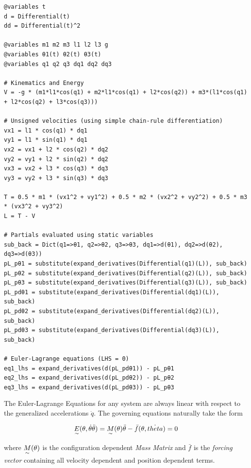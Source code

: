 \begin{verbatim}
@variables t
d = Differential(t)
dd = Differential(t)^2

@variables m1 m2 m3 l1 l2 l3 g
@variables θ1(t) θ2(t) θ3(t)
@variables q1 q2 q3 dq1 dq2 dq3

# Kinematics and Energy
V = -g * (m1*l1*cos(q1) + m2*l1*cos(q1) + l2*cos(q2)) + m3*(l1*cos(q1) + l2*cos(q2) + l3*cos(q3)))

# Unsigned velocities (using simple chain-rule differentiation)
vx1 = l1 * cos(q1) * dq1
vy1 = l1 * sin(q1) * dq1
vx2 = vx1 + l2 * cos(q2) * dq2
vy2 = vy1 + l2 * sin(q2) * dq2
vx3 = vx2 + l3 * cos(q3) * dq3
vy3 = vy2 + l3 * sin(q3) * dq3

T = 0.5 * m1 * (vx1^2 + vy1^2) + 0.5 * m2 * (vx2^2 + vy2^2) + 0.5 * m3 * (vx3^2 + vy3^2)
L = T - V

# Partials evaluated using static variables
sub_back = Dict(q1=>θ1, q2=>θ2, q3=>θ3, dq1=>d(θ1), dq2=>d(θ2), dq3=>d(θ3))
pL_pθ1 = substitute(expand_derivatives(Differential(q1)(L)), sub_back)
pL_pθ2 = substitute(expand_derivatives(Differential(q2)(L)), sub_back)
pL_pθ3 = substitute(expand_derivatives(Differential(q3)(L)), sub_back)
pL_pdθ1 = substitute(expand_derivatives(Differential(dq1)(L)), sub_back)
pL_pdθ2 = substitute(expand_derivatives(Differential(dq2)(L)), sub_back)
pL_pdθ3 = substitute(expand_derivatives(Differential(dq3)(L)), sub_back)

# Euler-Lagrange equations (LHS = 0)
eq1_lhs = expand_derivatives(d(pL_pdθ1)) - pL_pθ1
eq2_lhs = expand_derivatives(d(pL_pdθ2)) - pL_pθ2
eq3_lhs = expand_derivatives(d(pL_pdθ3)) - pL_pθ3
\end{verbatim}

The Euler-Lagrange Equations for any system are always linear with respect to the generalized accelerations $\ddot{q}$. The governing equations naturally take the form

\begin{equation}
    \underset{\sim}{E}(\theta, \dot\theta \ddot\theta) = \underset{\sim}{M}(\theta) \ddot{\theta} - \bar{f}(\theta, \dot{theta}) = 0
\end{equation}

where $\underset{\sim}{M}(\theta)$  is the configuration dependent \textit{Mass Matrix} and $\bar{f}$ is the \textit{forcing vector} containing all velocity dependent and position dependent terms.

